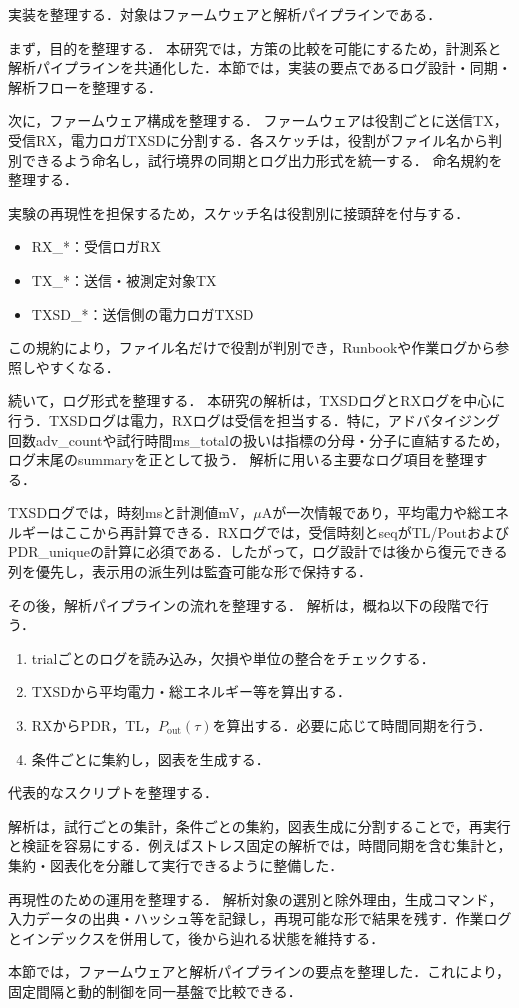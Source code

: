 ﻿%
実装を整理する．対象はファームウェアと解析パイプラインである．

まず，目的を整理する．
本研究では，方策の比較を可能にするため，計測系と解析パイプラインを共通化した．本節では，実装の要点であるログ設計・同期・解析フローを整理する．

次に，ファームウェア構成を整理する．
ファームウェアは役割ごとに送信TX，受信RX，電力ロガTXSDに分割する．各スケッチは，役割がファイル名から判別できるよう命名し，試行境界の同期とログ出力形式を統一する．
命名規約を整理する．

実験の再現性を担保するため，スケッチ名は役割別に接頭辞を付与する．
\begin{itemize}
  \item RX\_*：受信ロガRX
  \item TX\_*：送信・被測定対象TX
  \item TXSD\_*：送信側の電力ロガTXSD
\end{itemize}
この規約により，ファイル名だけで役割が判別でき，Runbookや作業ログから参照しやすくなる．

続いて，ログ形式を整理する．
本研究の解析は，TXSDログとRXログを中心に行う．TXSDログは電力，RXログは受信を担当する．特に，アドバタイジング回数adv\_countや試行時間ms\_totalの扱いは指標の分母・分子に直結するため，ログ末尾のsummaryを正として扱う．
解析に用いる主要なログ項目を整理する．

TXSDログでは，時刻msと計測値mV，$\mu$Aが一次情報であり，平均電力や総エネルギーはここから再計算できる．RXログでは，受信時刻とseqがTL/PoutおよびPDR\_uniqueの計算に必須である．したがって，ログ設計では後から復元できる列を優先し，表示用の派生列は監査可能な形で保持する．

その後，解析パイプラインの流れを整理する．
解析は，概ね以下の段階で行う．
\begin{enumerate}
  \item trialごとのログを読み込み，欠損や単位の整合をチェックする．
  \item TXSDから平均電力・総エネルギー等を算出する．
  \item RXからPDR，TL，$P_{\mathrm{out}}(\tau)$を算出する．必要に応じて時間同期を行う．
  \item 条件ごとに集約し，図表を生成する．
\end{enumerate}
代表的なスクリプトを整理する．

解析は，試行ごとの集計，条件ごとの集約，図表生成に分割することで，再実行と検証を容易にする．例えばストレス固定の解析では，時間同期を含む集計と，集約・図表化を分離して実行できるように整備した．

再現性のための運用を整理する．
解析対象の選別と除外理由，生成コマンド，入力データの出典・ハッシュ等を記録し，再現可能な形で結果を残す．作業ログとインデックスを併用して，後から辿れる状態を維持する．

本節では，ファームウェアと解析パイプラインの要点を整理した．これにより，固定間隔と動的制御を同一基盤で比較できる．







